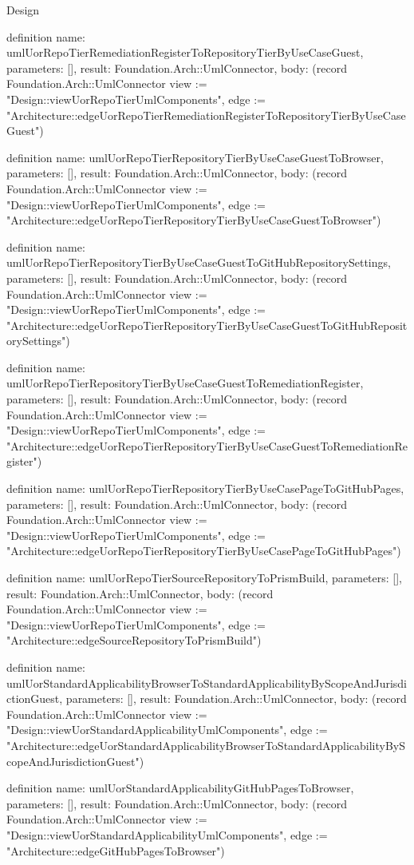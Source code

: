 \begin{lexlean}{Design}
\begin{semanticmodule}
definition{
  name: umlUorRepoTierRemediationRegisterToRepositoryTierByUseCaseGuest,
  parameters: [],
  result: Foundation.Arch::UmlConnector,
  body: (record Foundation.Arch::UmlConnector {view := "Design::viewUorRepoTierUmlComponents", edge := "Architecture::edgeUorRepoTierRemediationRegisterToRepositoryTierByUseCaseGuest"})
}

definition{
  name: umlUorRepoTierRepositoryTierByUseCaseGuestToBrowser,
  parameters: [],
  result: Foundation.Arch::UmlConnector,
  body: (record Foundation.Arch::UmlConnector {view := "Design::viewUorRepoTierUmlComponents", edge := "Architecture::edgeUorRepoTierRepositoryTierByUseCaseGuestToBrowser"})
}

definition{
  name: umlUorRepoTierRepositoryTierByUseCaseGuestToGitHubRepositorySettings,
  parameters: [],
  result: Foundation.Arch::UmlConnector,
  body: (record Foundation.Arch::UmlConnector {view := "Design::viewUorRepoTierUmlComponents", edge := "Architecture::edgeUorRepoTierRepositoryTierByUseCaseGuestToGitHubRepositorySettings"})
}

definition{
  name: umlUorRepoTierRepositoryTierByUseCaseGuestToRemediationRegister,
  parameters: [],
  result: Foundation.Arch::UmlConnector,
  body: (record Foundation.Arch::UmlConnector {view := "Design::viewUorRepoTierUmlComponents", edge := "Architecture::edgeUorRepoTierRepositoryTierByUseCaseGuestToRemediationRegister"})
}

definition{
  name: umlUorRepoTierRepositoryTierByUseCasePageToGitHubPages,
  parameters: [],
  result: Foundation.Arch::UmlConnector,
  body: (record Foundation.Arch::UmlConnector {view := "Design::viewUorRepoTierUmlComponents", edge := "Architecture::edgeUorRepoTierRepositoryTierByUseCasePageToGitHubPages"})
}

definition{
  name: umlUorRepoTierSourceRepositoryToPrismBuild,
  parameters: [],
  result: Foundation.Arch::UmlConnector,
  body: (record Foundation.Arch::UmlConnector {view := "Design::viewUorRepoTierUmlComponents", edge := "Architecture::edgeSourceRepositoryToPrismBuild"})
}

definition{
  name: umlUorStandardApplicabilityBrowserToStandardApplicabilityByScopeAndJurisdictionGuest,
  parameters: [],
  result: Foundation.Arch::UmlConnector,
  body: (record Foundation.Arch::UmlConnector {view := "Design::viewUorStandardApplicabilityUmlComponents", edge := "Architecture::edgeUorStandardApplicabilityBrowserToStandardApplicabilityByScopeAndJurisdictionGuest"})
}

definition{
  name: umlUorStandardApplicabilityGitHubPagesToBrowser,
  parameters: [],
  result: Foundation.Arch::UmlConnector,
  body: (record Foundation.Arch::UmlConnector {view := "Design::viewUorStandardApplicabilityUmlComponents", edge := "Architecture::edgeGitHubPagesToBrowser"})
}


\end{semanticmodule}
\end{lexlean}
